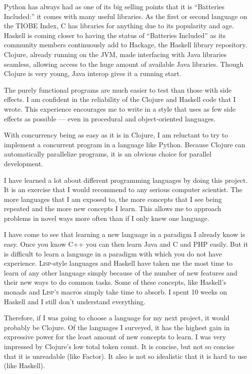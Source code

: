 \documentclass{article}
\begin{document}
Python has always had as one of its big selling points that it is ``Batteries
Included:'' it comes with many useful libraries.  As the first or second
language on the TIOBE Index, C has libraries for anything due to its popularity
and age.  Haskell is coming closer to having the status of ``Batteries
Included'' as its community members continuously add to Hackage, the Haskell
library repository.  Clojure, already running on the JVM, made interfacing with
Java libraries seamless, allowing access to the huge amount of available Java
libraries.  Though Clojure is very young, Java interop gives it a running
start.

The purely functional programs are much easier to test than those with side
effects.  I am confident in the reliability of the Clojure and Haskell code that
I wrote.  This experience encourages me to write in a style that uses as few
side effects as possible --- even in procedural and object-oriented languages.  

With concurrency being as easy as it is in Clojure, I am reluctant to try to
implement a concurrent program in a language like Python.  Because Clojure can
automatically parallelize programs, it is an obvious choice for parallel
development.

I have learned a lot about different programming languages by doing this
project.  It is an exercise that I would recommend to any serious computer
scientist.  The more languages that I am exposed to, the more concepts that I
see being repeated and the more new concepts I learn.  This allows me to
approach problems in novel ways more often than if I only knew one language.

I have come to see that learning a new language in a paradigm I already know is
easy.  Once you know C++ you can then learn Java and C and PHP easily.  But it
is difficult to learn a language in a paradigm with which you do not have
experience.  \textsc{Lisp}-style languages and Haskell have taken me the most
time to learn of any other language simply because of the number of new features
and their new ways to do common tasks.  Some of these concepts, like Haskell's
monads and \textsc{Lisp's} macros simply take time to absorb.  I spent 10 weeks
on Haskell and I still don't understand everything.

Therefore, if I was going to choose a language for my next project, it would
probably be Clojure.  Of the languages I surveyed, it has the highest gain in
expressive power for the least amount of new concepts to learn.  I was very
impressed by Clojure's low total token count.  It is concise, but not so concise
that it is unreadable (like Factor).  It also is not so idealistic that it is
hard to use (like Haskell).
\end{document}
